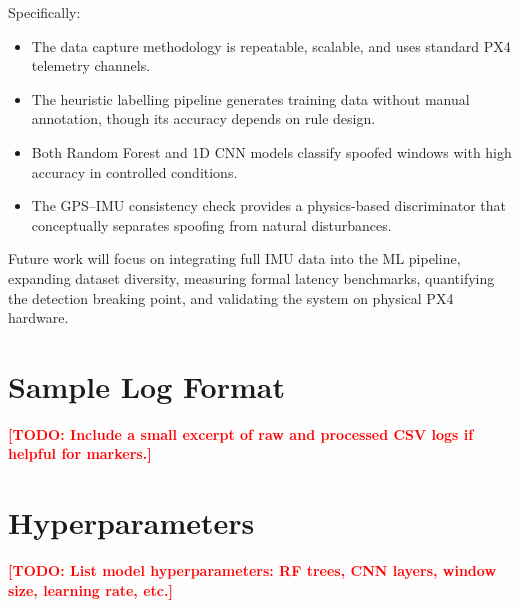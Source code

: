 \documentclass[11pt,a4paper]{article}
\newcommand{\todo}[1]{\textcolor{red}{\textbf{[TODO: #1]}}}
\begin{document}
Specifically:
\begin{itemize}
    \item The data capture methodology is repeatable, scalable, and uses standard PX4 telemetry channels.
    \item The heuristic labelling pipeline generates training data without manual annotation, though its accuracy depends on rule design.
    \item Both Random Forest and 1D CNN models classify spoofed windows with high accuracy in controlled conditions.
    \item The GPS--IMU consistency check provides a physics-based discriminator that conceptually separates spoofing from natural disturbances.
\end{itemize}

Future work will focus on integrating full IMU data into the ML pipeline, expanding dataset diversity, measuring formal latency benchmarks, quantifying the detection breaking point, and validating the system on physical PX4 hardware.

\appendix
\section{Sample Log Format}
\label{app:logs}

\todo{Include a small excerpt of raw and processed CSV logs if helpful for markers.}

\section{Hyperparameters}
\label{app:hyperparams}

\todo{List model hyperparameters: RF trees, CNN layers, window size, learning rate, etc.}
\end{document}
